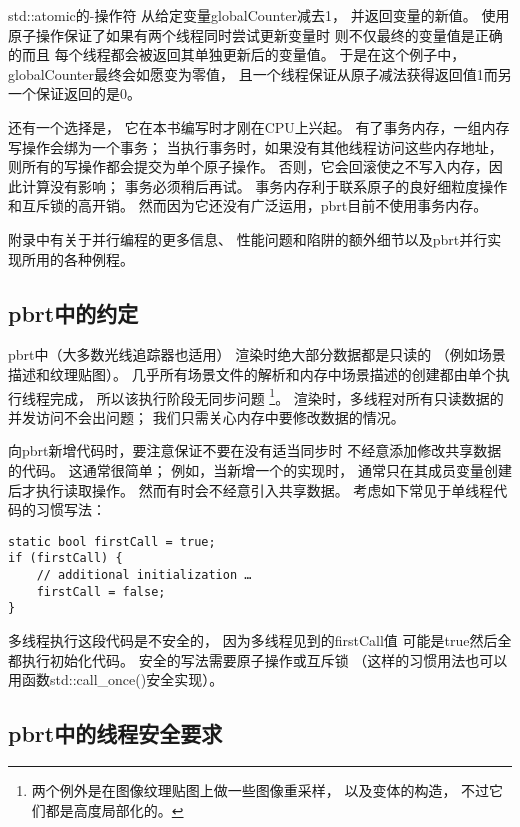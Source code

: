 {\ttfamily std::atomic}的{\ttfamily -}操作符
从给定变量{\ttfamily globalCounter}减去1，
并返回变量的新值。
使用原子操作保证了如果有两个线程同时尝试更新变量时
则不仅最终的变量值是正确的而且
每个线程都会被返回其单独更新后的变量值。
于是在这个例子中，{\ttfamily globalCounter}最终会如愿变为零值，
且一个线程保证从原子减法获得返回值1而另一个保证返回的是0。

还有一个选择是，
它在本书编写时才刚在CPU上兴起。
有了事务内存，一组内存写操作会绑为一个事务；
当执行事务时，如果没有其他线程访问这些内存地址，
则所有的写操作都会提交为单个原子操作。
否则，它会回滚使之不写入内存，因此计算没有影响；
事务必须稍后再试。
事务内存利于联系原子的良好细粒度操作和互斥锁的高开销。
然而因为它还没有广泛运用，pbrt目前不使用事务内存。

附录中有关于并行编程的更多信息、
性能问题和陷阱的额外细节以及pbrt并行实现所用的各种例程。

\subsection{pbrt中的约定}\label{sub:pbrt中的约定}
pbrt中（大多数光线追踪器也适用）
渲染时绝大部分数据都是只读的
（例如场景描述和纹理贴图）。
几乎所有场景文件的解析和内存中场景描述的创建都由单个执行线程完成，
所以该执行阶段无同步问题
\footnote{两个例外是在图像纹理贴图上做一些图像重采样，
    以及\protect{}变体的构造，
    不过它们都是高度局部化的。}。
渲染时，多线程对所有只读数据的并发访问不会出问题；
我们只需关心内存中要修改数据的情况。

向pbrt新增代码时，要注意保证不要在没有适当同步时
不经意添加修改共享数据的代码。
这通常很简单；
例如，当新增一个的实现时，
通常只在其成员变量创建后才执行读取操作。
然而有时会不经意引入共享数据。
考虑如下常见于单线程代码的习惯写法：
\begin{lstlisting}
static bool firstCall = true;
if (firstCall) {
    // additional initialization …
    firstCall = false;
}
\end{lstlisting}

多线程执行这段代码是不安全的，
因为多线程见到的{\ttfamily firstCall}值
可能是{\ttfamily true}然后全都执行初始化代码。
安全的写法需要原子操作或互斥锁
（这样的习惯用法也可以用函数{\ttfamily std::call\_once()}安全实现）。

\subsection{pbrt中的线程安全要求}

